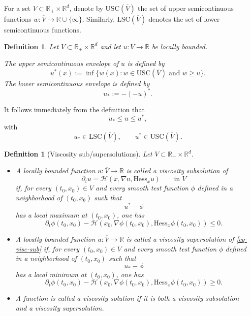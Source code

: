 \documentclass[11pt]{article}
\newcommand{\R}{\mathbb R}
\newtheorem{definition}[theorem]{Definition}
\theoremstyle{rem}
\begin{document}
\medskip

For a set $V\subset \R_+\times\R^d$, denote by
$\mathrm{USC}(\overline V)$ the set of upper semicontinuous functions
$w:\overline V\to\R\cup\{\infty\}$. Similarly,
$\mathrm{LSC}(\overline V)$ denotes the set of lower semicontinuous functions.

\begin{definition}
Let $V\subset \R_+\times\R^d$ and let
$u:\overline V\to\R$ be locally bounded.

The upper semicontinuous envelope of $u$ is defined by
\begin{equation}\label{eq:semic-envel-def}
u^*(x)
:=
\inf\big\{
w(x):
w\in \mathrm{USC}(\overline V)
\text{ and }w\geq u
\big\}.
\end{equation}
The lower semicontinuous envelope is defined by
\[
u_*:=-(-u)^*.
\]
\end{definition}

It follows immediately from the definition that
\[
u_*\leq u\leq u^*,
\]
with
\[
u_*\in\mathrm{LSC}(\overline V),
\qquad
u^*\in\mathrm{USC}(\overline V).
\]

\begin{definition}[Viscosity sub/supersolutions]
\label{def:SubSuperSol}
Let $V\subset \R_+\times\R^d$.

\begin{itemize}

\item
A locally bounded function
$u:\overline V\to\R$
is called a viscosity subsolution of
\begin{equation}\label{eq-visc-sub}
\partial_t u
=
\mathcal H(x,\nabla u,\mathrm{Hess}_x u)
\qquad
\text{in }V
\end{equation}
if, for every $(t_0,x_0)\in V$ and every smooth test function $\phi$ defined in a neighborhood of $(t_0,x_0)$ such that
\[
u^*-\phi
\]
has a local maximum at $(t_0,x_0)$, one has
\[
\partial_t\phi(t_0,x_0)
-
\mathcal H(
x_0,
\nabla\phi(t_0,x_0),
\mathrm{Hess}_x\phi(t_0,x_0)
)
\leq0.
\]

\item
A locally bounded function
$u:\overline V\to\R$
is called a viscosity supersolution of \eqref{eq-visc-sub} if, for every $(t_0,x_0)\in V$ and every smooth test function $\phi$ defined in a neighborhood of $(t_0,x_0)$ such that
\[
u_*-\phi
\]
has a local minimum at $(t_0,x_0)$, one has
\[
\partial_t\phi(t_0,x_0)
-
\mathcal H(
x_0,
\nabla\phi(t_0,x_0),
\mathrm{Hess}_x\phi(t_0,x_0)
)
\geq0.
\]

\item
A function is called a viscosity solution if it is both a viscosity subsolution and a viscosity supersolution.

\end{itemize}
\end{definition}
\end{document}

